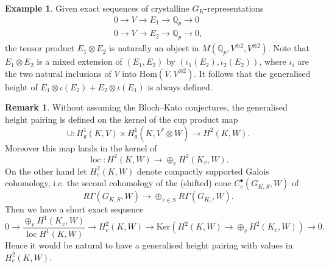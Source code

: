 \documentclass[11pt]{amsart}
\def\Q{\mathbb Q}
\theoremstyle{plain}
\theoremstyle{definition}
\newtheorem{example}{Example}
\newtheorem{remark}{Remark}
\DeclareMathOperator{\loc}{loc}
\newcommand{\Ker}{\mathrm{Ker}}
\newcommand{\Hom}{\mathrm{Hom}}
\begin{document}
\begin{example}
Given exact sequences of crystalline $G_K$-representations
\begin{align*}
0\to V\to E_1 \to \Q _p \to 0 \\
0\to V \to E_2 \to \Q _p \to 0 ,
\end{align*}
the tensor product $E_1 \otimes E_2 $ is naturally an object in $M(\Q _p ,V^{\oplus 2},V^{\otimes 2})$. Note that $E_1 \otimes E_2 $ is a mixed extension of $(E_1 ,E_2 )$ by $(\iota _1 (E_2 ),\iota _2 (E_2 ))$, where $\iota _i $ are the two natural inclusions of $V$ into $\Hom (V,V^{\otimes 2})$. It follows that the generalised height of $E_1 \otimes \iota (E_2 )+E_2 \otimes \iota (E_1 )$ is always defined.
\end{example}
\begin{remark}
Without assuming the Bloch--Kato conjectures, the generalised height pairing is defined on the kernel of the cup product map
\[
\cup :H^1 _g (K ,V)\times H^1 _g (K ,V^* \otimes W)\to H^2 (K ,W).
\]
Moreover this map lands in the kernel of 
\[
\loc :H^2 (K ,W)\to \oplus _v H^2 (K _v  ,W).
\] 
On the other hand let $H^2 _c (K ,W)$ denote compactly supported Galois cohomology, i.e. the second cohomology of the (shifted) cone $C^\bullet _c (G_{K ,S},W)$ of
\[
R\Gamma (G_{K ,S},W)\to \oplus _{v\in S}R\Gamma (G_{K _v },W).
\]
Then we have a short exact sequence
\[
0\to \frac{\oplus _{v}H^1 (K _v ,W)}{\loc H^1 (K ,W)}\to H^2 _c (K ,W)\to \Ker (H^2 (K ,W)\to \oplus _v H^2 (K _v ,W))\to 0.
\]
Hence it would be natural to have a generalised height pairing with values in $H^2 _c (K ,W)$. 
\end{remark}
\end{document}
